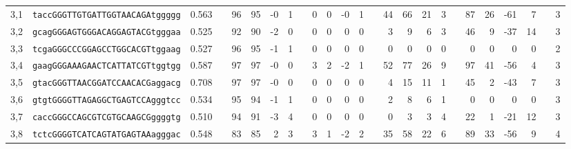 \begin{tabular}{rlrcrrrrcrrrrcrrrrcrrrrcr}
3,1 &
 \texttt{taccGGGTTGTGATTGGTAACAGAtggggg} &
 0.563 &
 &
 96 &
  95 &
  -0 &
  1 &
  &
 0 &
  0 &
  -0 &
  1 &
  &
 44 &
  66 &
  21 &
  3 &
  &
 87 &
  26 &
  -61 &
  7 &
  &
 3 \\

3,2 &
 \texttt{gcagGGGAGTGGGACAGGAGTACGtgggaa} &
 0.525 &
 &
 92 &
  90 &
  -2 &
  0 &
  &
 0 &
  0 &
  0 &
  0 &
  &
 3 &
  9 &
  6 &
  3 &
  &
 46 &
  9 &
  -37 &
  14 &
  &
 3 \\

3,3 &
 \texttt{tcgaGGGCCCGGAGCCTGGCACGTtggaag} &
 0.527 &
 &
 96 &
  95 &
  -1 &
  1 &
  &
 0 &
  0 &
  0 &
  0 &
  &
 0 &
  0 &
  0 &
  0 &
  &
 0 &
  0 &
  0 &
  0 &
  &
 2 \\

3,4 &
 \texttt{gaagGGGAAAGAACTCATTATCGTtggtgg} &
 0.587 &
 &
 97 &
  97 &
  -0 &
  0 &
  &
 3 &
  2 &
  -2 &
  1 &
  &
 52 &
  77 &
  26 &
  9 &
  &
 97 &
  41 &
  -56 &
  4 &
  &
 3 \\

3,5 &
 \texttt{gtacGGGTTAACGGATCCAACACGaggacg} &
 0.708 &
 &
 97 &
  97 &
  -0 &
  0 &
  &
 0 &
  0 &
  0 &
  0 &
  &
 4 &
  15 &
  11 &
  1 &
  &
 45 &
  2 &
  -43 &
  7 &
  &
 3 \\

3,6 &
 \texttt{gtgtGGGGTTAGAGGCTGAGTCCAgggtcc} &
 0.534 &
 &
 95 &
  94 &
  -1 &
  1 &
  &
 0 &
  0 &
  0 &
  0 &
  &
 2 &
  8 &
  6 &
  1 &
  &
 0 &
  0 &
  0 &
  0 &
  &
 3 \\

3,7 &
 \texttt{caccGGGCCAGCGTCGTGCAAGCGggggtg} &
 0.510 &
 &
 94 &
  91 &
  -3 &
  4 &
  &
 0 &
  0 &
  0 &
  0 &
  &
 0 &
  3 &
  3 &
  4 &
  &
 22 &
  1 &
  -21 &
  12 &
  &
 3 \\

3,8 &
 \texttt{tctcGGGGTCATCAGTATGAGTAAagggac} &
 0.548 &
 &
 83 &
  85 &
  2 &
  3 &
  &
 3 &
  1 &
  -2 &
  2 &
  &
 35 &
  58 &
  22 &
  6 &
  &
 89 &
  33 &
  -56 &
  9 &
  &
 4 \\

\bottomrule
\end{tabular}